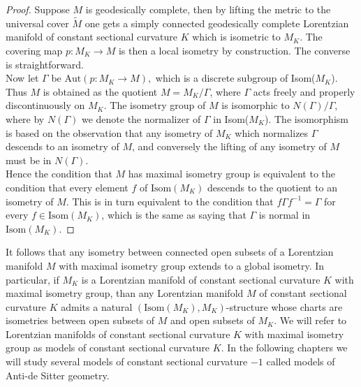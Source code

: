 \begin{proof}
    Suppose $M$ is geodesically complete, then by lifting the metric to the universal cover $\widetilde{M}$ one gets a simply connected geodesically complete Lorentzian manifold of constant sectional curvature $K$ which is isometric to $M_K$. The covering map $p:M_K\to M$ is then a local isometry by construction. The converse is straightforward. \\   
    Now let $\Gamma$ be $\text{Aut}(p:M_K\to M),$ which is a discrete subgroup of Isom($M_K$). Thus $M$ is obtained as the quotient $M=M_{K}/\Gamma$, where $\Gamma$ acts freely and properly discontinuously on $M_K$. The isometry group of $M$ is isomorphic to $N(\Gamma)/\Gamma$, where by $N(\Gamma)$ we denote the normalizer of $\Gamma$ in Isom($M_K$). The isomorphism is based on the observation that any isometry of $M_K$ which normalizes $\Gamma$ descends to an isometry of $M$, and conversely the lifting of any isometry of $M$ must be in $N(\Gamma).$\\
    Hence the condition that $M$ has maximal isometry group is equivalent to the condition that every element $f$ of $\text{Isom}(M_K)$ descends to the quotient to an isometry of $M$. This is in turn equivalent to the condition that $f\Gamma f^{-1}=\Gamma$ for every $f\in \text{Isom}(M_K)$, which is the same as saying that $\Gamma$ is normal in $\text{Isom}(M_K)$.
\end{proof}
It follows that any isometry between connected open subsets of a Lorentzian manifold $M$ with maximal isometry group extends to a global isometry. 
In particular, if $M_K$ is a Lorentzian manifold of constant sectional curvature $K$ with maximal isometry group, than any Lorentzian manifold $M$ of constant sectional curvature $K$ admits a natural $(\text{Isom}(M_K),M_K)$-structure whose charts are isometries between open subsets of $M$ and open subsets of $M_K$.
We will refer to Lorentzian manifolds of constant sectional curvature $K$ with maximal isometry group as models of constant sectional curvature $K$. In the following chapters we will study several models of constant sectional curvature $-1$ called models of Anti-de Sitter geometry.